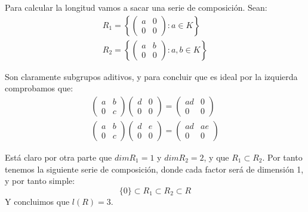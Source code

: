 \begin{ejerciciostar}
    \noindent
    Para calcular la longitud vamos a sacar una serie de composición. Sean:
    \begin{gather*}
        R_1 = \left\{\left(\begin{array}{cc}
            a & 0 \\
            0 & 0 
        \end{array}\right) : a \in K\right\} \\
        R_2 = \left\{\left(\begin{array}{cc}
            a & b \\
            0 & 0 
        \end{array}\right) : a, b \in K\right\}
    \end{gather*}

    Son claramente subgrupos aditivos, y para concluir que es ideal por la izquierda comprobamos que:
    \begin{gather*}
        \left(\begin{array}{cc}
            a & b \\
            0 & c  
        \end{array}\right) 
        \left(\begin{array}{cc}
            d & 0 \\
            0 & 0 
        \end{array}\right) 
        = \left(\begin{array}{cc}
            ad & 0 \\
            0 &  0
        \end{array}\right) \\
        \left(\begin{array}{cc}
            a & b \\
            0 & c  
        \end{array}\right)
        \left(\begin{array}{cc}
            d & e \\
            0 & 0 
        \end{array}\right) 
        =\left(\begin{array}{cc}
            ad & ae \\
            0 & 0 
        \end{array}\right)
    \end{gather*}

    Está claro por otra parte que $dimR_1 = 1$ y $dimR_2 = 2$, y que $R_1 \subset R_2$. Por tanto tenemos la siguiente serie de composición, donde cada factor será de dimensión 1, y por tanto simple:
    \begin{equation*}
        \{0\}\subset R_1 \subset R_2 \subset R
    \end{equation*}
    Y concluimos que $l(R) = 3$.
\end{ejerciciostar}

